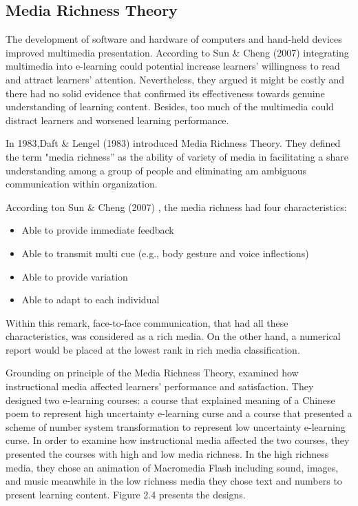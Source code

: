 
\subsection{Media Richness Theory} 

The development of software and hardware of computers and hand-held devices improved multimedia presentation. According to Sun \& Cheng (2007) \cite{sun2007design} integrating multimedia into e-learning could potential increase learners' willingness to read and attract learners' attention. Nevertheless, they argued it might be costly and there had no solid evidence that confirmed its effectiveness towards genuine understanding of learning content. Besides, too much of the multimedia could distract learners and worsened learning performance. 

In 1983,Daft \& Lengel (1983) \cite{daft1983information} introduced Media Richness Theory. They defined the term "media richness'' as the ability of variety of media in facilitating a share understanding among a group of people and eliminating am ambiguous communication within organization. 

According ton Sun \& Cheng (2007) \cite{sun2007design}, the media richness had four characteristics: 
\begin{itemize} 
\item Able to provide immediate feedback
\item Able to transmit multi cue (e.g., body gesture and voice inflections)
\item Able to provide variation
\item Able to adapt to each individual
\end{itemize} 

Within this remark, face-to-face communication, that had all these characteristics, was considered as a rich media. On the other hand, a numerical report would be placed at the lowest rank in rich media classification. 

Grounding on principle of the Media Richness Theory, \cite{sun2007design} examined how instructional media affected learners' performance and satisfaction. They designed two e-learning courses: a course that explained meaning of a Chinese poem to represent high uncertainty e-learning curse and a course that presented a scheme of number system transformation to represent low uncertainty e-learning curse. In order to examine how instructional media affected the two courses, they presented the courses with high and low media richness. In the high richness media, they chose an animation of Macromedia Flash including sound, images, and music meanwhile in the low richness media they chose text and numbers to present learning content. Figure 2.4 presents the designs. 

